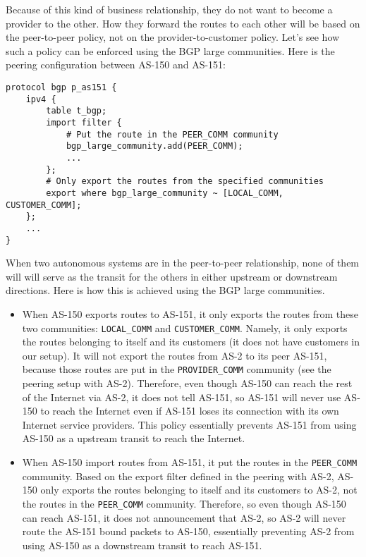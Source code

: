 Because of this kind of business relationship, they do not want to
become a provider to the other. How they forward the routes to each other 
will be based on the peer-to-peer policy, 
not on the provider-to-customer policy. Let's see how such a policy
can be enforced using the BGP large communities. 
Here is the peering configuration between AS-150 and AS-151:

\begin{lstlisting}
protocol bgp p_as151 {
    ipv4 {
        table t_bgp;
        import filter {
            # Put the route in the PEER_COMM community
            bgp_large_community.add(PEER_COMM);
            ...
        };
        # Only export the routes from the specified communities
        export where bgp_large_community ~ [LOCAL_COMM, CUSTOMER_COMM];
    };
    ...
}
\end{lstlisting}

When two autonomous systems are in the peer-to-peer relationship, none of them
will will serve as the transit for the others in either upstream or 
downstream directions. Here is how this is achieved using the BGP 
large communities.

\begin{itemize}
  \item When AS-150 exports routes to AS-151, it only exports the routes
    from these two communities: \texttt{LOCAL\_COMM} and \texttt{CUSTOMER\_COMM}.
    Namely, it only exports the routes belonging to itself and its 
    customers (it does not have customers in our setup). It will not export the 
    routes from AS-2 to its peer AS-151, because those routes are put in the 
    \texttt{PROVIDER\_COMM} community (see the peering setup with AS-2).
    Therefore, even though AS-150 can reach the rest of the Internet via AS-2,
    it does not tell AS-151, so AS-151 will never use AS-150 to reach the 
    Internet even if AS-151 loses its connection with its own Internet service
    providers. This policy essentially prevents AS-151 from using AS-150 
    as a upstream transit to reach the Internet.


  \item When AS-150 import routes from AS-151, it put the routes in
    the \texttt{PEER\_COMM} community. Based on the export 
    filter defined in the peering with AS-2, 
    AS-150 only exports the routes belonging to itself and its 
    customers to AS-2, not the routes in the \texttt{PEER\_COMM} community. 
    Therefore, so even though AS-150 can reach AS-151, it does not announcement that
    AS-2, so AS-2 will never route the AS-151 bound packets to AS-150, 
    essentially preventing AS-2 from using AS-150 as 
    a downstream transit to reach AS-151.
\end{itemize}
 


